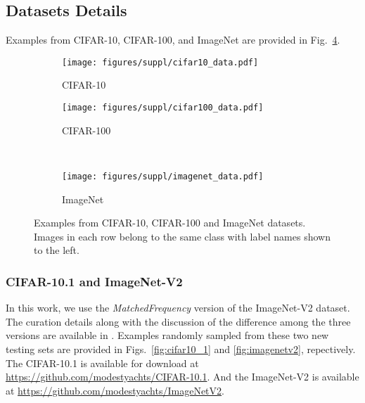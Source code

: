\documentclass[journal]{IEEEtran}
\theoremstyle{definition}
\theoremstyle{remark}
\begin{document}
\subsection{Datasets Details\label{sec:dataset_detail}}
Examples from CIFAR-10, CIFAR-100, and ImageNet are provided in Fig.~\ref{fig:data_gallery}. 

\begin{figure}[t]
    \vspace{-2mm}
	\centering
	\begin{subfigure}[t]{.24\textwidth}
		\centering
		\texttt{[image: figures/suppl/cifar10\_data.pdf]}
		\caption{CIFAR-10\label{fig:cifar10_data}}
	\end{subfigure}
	\begin{subfigure}[t]{.24\textwidth}
		\centering
		\texttt{[image: figures/suppl/cifar100\_data.pdf]}
		\caption{CIFAR-100\label{fig:cifar100_data}}
	\end{subfigure} \\
	\begin{subfigure}[t]{.48\textwidth}
		\centering
		\vspace{+2mm}
		\texttt{[image: figures/suppl/imagenet\_data.pdf]}
		\caption{ImageNet\label{fig:imagenet_data}}
	\end{subfigure}
	\caption{Examples from CIFAR-10, CIFAR-100 and ImageNet datasets. Images in each row belong to the same class with label names shown to the left.
	\label{fig:data_gallery}\vspace{-0.3cm}}
\end{figure}

\subsubsection{CIFAR-10.1 and ImageNet-V2}
In this work, we use the \emph{MatchedFrequency} version of the ImageNet-V2 dataset. The curation details along with the discussion of the difference among the three versions are available in \cite{recht2019imagenet}. Examples randomly sampled from these two new testing sets are provided in Figs.~\ref{fig:cifar10_1} and \ref{fig:imagenetv2}, repectively. The CIFAR-10.1 is available for download at {\color{red} \url{https://github.com/modestyachts/CIFAR-10.1}}. And the ImageNet-V2 is available at {\color{red} \url{https://github.com/modestyachts/ImageNetV2}}.
\end{document}
